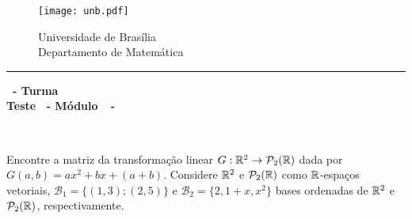 \documentclass[12pt]{exam}
\begin{document}
    \begin{figure}[h]
        \begin{minipage}[c]{1.7cm}
            \texttt{[image: unb.pdf]}
        \end{minipage}
        \hspace{0pt}
        \begin{minipage}[c]{4in}
            {Universidade de Brasília} \\
            {Departamento de Matemática}
        \end{minipage}
    \end{figure}
    \hrule
    \begin{center}
        {\Large\bf \disciplina\ - Turma \turma}  \\
         {\large\bf Teste \numeroteste\ - Módulo\ \modulo\ -\ \dataavaliacao}
    \end{center}

    \\
    \vspace*{.01cm}

    \vspace{.4cm}

    \questao{} Encontre a matriz da transformação linear $G : \mathbb{R}^2 \to \mathcal{P}_2(\mathbb{R})$ dada por $G(a,b) = ax^2 + bx + (a + b)$.
    Considere $\mathbb{R}^2$ e $\mathcal{P}_2(\mathbb{R})$ como $\mathbb{R}$-espaços vetoriais, $\mathcal{B}_1 = \{(1,3); (2,5)\}$ e
    $\mathcal{B}_2 = \{2, 1 + x, x^2\}$ bases ordenadas de $\mathbb{R}^2$ e $\mathcal{P}_2(\mathbb{R})$, respectivamente.

    \vspace*{.5cm}
\end{document}
